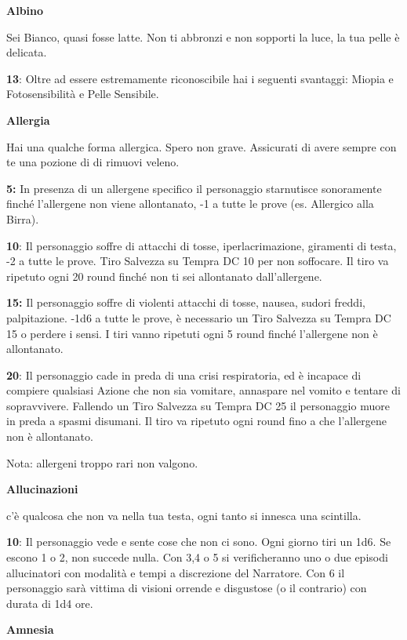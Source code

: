 \documentclass[a4paper,twoside,openany]{book}
\begin{document}
\begin{multicols}{2}

\textbf{Albino}

Sei Bianco, quasi fosse latte. Non ti abbronzi e non sopporti la luce, la tua pelle è delicata.

\textbf{13}: Oltre ad essere estremamente riconoscibile hai i seguenti svantaggi: Miopia e Fotosensibilità e Pelle Sensibile.

\textbf{Allergia}

Hai una qualche forma allergica. Spero non grave. Assicurati di avere sempre con te una pozione di di rimuovi veleno.

\textbf{5:} In presenza di un allergene specifico il personaggio starnutisce sonoramente finché l'allergene non viene allontanato, -1 a tutte le prove (es. Allergico alla Birra).

\textbf{10}: Il personaggio soffre di attacchi di tosse, iperlacrimazione, giramenti di testa, -2 a tutte le prove. Tiro Salvezza su Tempra DC 10 per non soffocare. Il tiro va ripetuto ogni 20 round finché non ti sei allontanato dall'allergene.

\textbf{15:} Il personaggio soffre di violenti attacchi di tosse, nausea, sudori freddi, palpitazione. -1d6 a tutte le prove, è necessario un Tiro Salvezza su Tempra DC 15 o perdere i sensi. I tiri vanno ripetuti ogni 5 round finché l'allergene non è allontanato.

\textbf{20}: Il personaggio cade in preda di una crisi respiratoria, ed è incapace di compiere qualsiasi Azione che non sia vomitare, annaspare nel vomito e tentare di sopravvivere. Fallendo un Tiro Salvezza su Tempra DC 25 il personaggio muore in preda a spasmi disumani. Il tiro va ripetuto ogni round fino a che l'allergene non è allontanato.

Nota: allergeni troppo rari non valgono.

\textbf{Allucinazioni}

c'è qualcosa che non va nella tua testa, ogni tanto si innesca una scintilla.

\textbf{10}: Il personaggio vede e sente cose che non ci sono. Ogni giorno tiri un 1d6.
Se escono 1 o 2, non succede nulla.
Con 3,4 o 5 si verificheranno uno o due episodi allucinatori con modalità e tempi a discrezione del Narratore.
Con 6 il personaggio sarà vittima di visioni orrende e disgustose (o il contrario) con durata di 1d4 ore.

\textbf{Amnesia}


\end{multicols}
\end{document}
